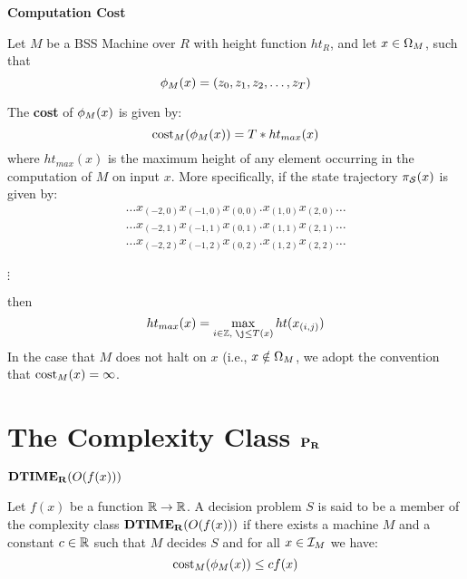 \begin{definition}{\textbf{Computation Cost}}
  \label{def:cost}
  
  Let $M$ be a BSS Machine over $R$ with height function $ht_R$, and
  let $x \in \Omega_M$, such that 
  $$\phi_M(x) = (z_0, z_1,z_2, \ldots, z_T)$$ 
  
  The \textbf{cost} of $\phi_M(x)$ is given by:
  $$\text{cost}_M(\phi_M(x)) = T*ht_{max}(x)$$
  where $ht_{max}(x)$ is the maximum height of any element occurring
  in the computation of $M$ on input $x$.  More specifically, if the
  state trajectory $\pi_{\mathcal{S}}(x)$ is given by: 
  \begin{eqnarray*}
    \ldots x_{(-2,0)}x_{(-1,0)}x_{(0,0)}.x_{(1,0)}x_{(2,0)} \ldots \\ 
    \ldots x_{(-2,1)}x_{(-1,1)}x_{(0,1)}.x_{(1,1)}x_{(2,1)} \ldots \\ 
    \ldots x_{(-2,2)}x_{(-1,2)}x_{(0,2)}.x_{(1,2)}x_{(2,2)} \ldots \\
  \end{eqnarray*}
  
  \vspace{-\baselineskip}
  \centerline{$\vdots$}

  then $$ht_{max}(x) = \max_{i \in \integers, \; \j \leq T(x)}ht(x_{(i,j)})$$
  In the case that $M$ does not halt on $x$ (i.e., $x \notin
  \Omega_M$, we adopt the convention that $\text{cost}_M(x) = \infty$.
\end{definition}


\section{The Complexity Class $\mathbf{P_R}$}

\begin{definition}\textbf{$\mathbf{DTIME_R}(O(f(x)))$}

  Let $f(x)$ be a function $\mathbb{R} \rightarrow \mathbb{R}$.  A decision
  problem $S$ is said to be a member of the complexity class
  $\mathbf{DTIME_R}(O(f(x)))$ if there exists a machine $M$ and a constant $c
  \in \mathbb{R}$ such that $M$ decides $S$ and for all $x \in \mathcal{I}_M$
  we have:
  $$\text{cost}_M(\phi_M(x)) \leq cf(x)$$
\end{definition}

